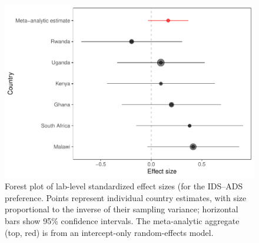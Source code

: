 \documentclass[
  ,man,floatsintext]{apa6}
\begin{document}
\begin{figure}
\centering
\includegraphics{mb1a-paper_files/figure-latex/unnamed-chunk-35-1.pdf}
\caption{\label{fig:unnamed-chunk-35}Forest plot of lab-level standardized effect sizes (for the IDS--ADS preference. Points represent individual country estimates, with size proportional to the inverse of their sampling variance; horizontal bars show 95\% confidence intervals. The meta-analytic aggregate (top, red) is from an intercept-only random-effects model.}
\end{figure}
\end{document}
